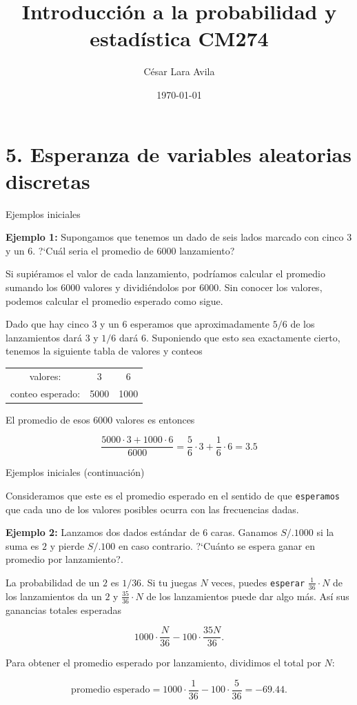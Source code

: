 \documentclass[10pt]{beamer}
\title{Introducci\'on a la probabilidad y estad\'istica CM274}
\date{\today}
\author{C\'esar Lara Avila}
\institute{\url{https://github.com/C-Lara}}
\begin{document}
  \maketitle
  \section{5. Esperanza de variables aleatorias discretas }
  
\begin{frame}{Ejemplos iniciales}
\small {\textbf{Ejemplo 1:} Supongamos que tenemos un dado de seis lados marcado con cinco  $3$ y un $6$. ?`Cu\'al seria  el promedio de $6000$ lanzamiento?
	
Si supi\'eramos el valor de cada lanzamiento, podr\'iamos calcular el promedio sumando los $6000$ valores y dividi\'endolos por $6000$. Sin conocer los valores, podemos calcular el promedio esperado como sigue.

Dado que hay cinco $3$ y un $6$ esperamos que aproximadamente $5/6$ de los lanzamientos dar\'a $3$ y $1/6$ dar\'a $6$. Suponiendo que esto sea exactamente cierto, tenemos la siguiente tabla de valores y conteos

\begin{table}[]
	\centering
	\begin{tabular}{ccc}
		valores:        & 3    & 6    \\
		conteo esperado: & 5000 & 1000
	\end{tabular}
\end{table}

El promedio de esos $6000$ valores es entonces

\[
\frac{5000\cdot 3 + 1000\cdot 6}{6000} = \frac{5}{6}\cdot 3 + \frac{1}{6}\cdot 6 = 3.5
\]


}
\end{frame}

\begin{frame}{Ejemplos iniciales (continuaci\'on)}
\small{Consideramos que este es el promedio esperado en el sentido de que \texttt{esperamos} que cada uno de los valores posibles ocurra con las frecuencias dadas.

\textbf{Ejemplo 2:} Lanzamos dos dados est\'andar de $6$ caras. Ganamos $S/. 1000$ si la suma es $2$ y pierde $S/.100$ en caso contrario. ?`Cu\'anto se espera ganar en promedio por lanzamiento?.

La probabilidad de un $2$ es $1/36$. Si tu juegas $N$ veces, puedes \texttt{esperar} $\frac{1}{36}\cdot N$ de los lanzamientos da un $2$ y $\frac{35}{36}\cdot N$ de los lanzamientos puede dar algo m\'as. As\'i sus ganancias  totales esperadas

\[
1000\cdot \frac{N}{36} - 100\cdot \frac{35N}{36}.
\]	

Para obtener el promedio esperado por lanzamiento, dividimos el total por $N$:

\[
\text{promedio esperado} = 1000\cdot \frac{1}{36} - 100\cdot \frac{5}{36} = -69.44.
\]
}


\end{frame}
\end{document}
